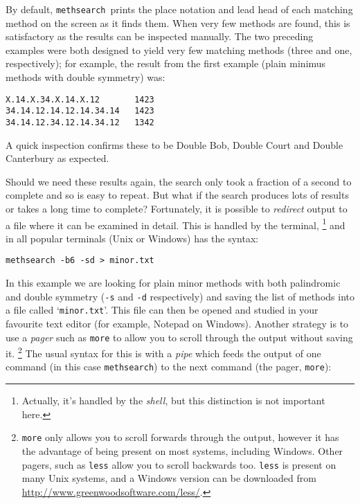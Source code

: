 \documentclass[a4paper,11pt,oneside]{book}
\makeatletter
\def\textitidx#1{\textit{#1}\index{#1}}
\newcommand{\oi}[1]{\index{#1@{\hspace*{-\optwidth}\texttt{-}\texttt{#1}}}}
\newcommand{\symidx}[2]{} %
\newcommand{\ttcmdidx}[1]{\texttt{#1}\index{#1@{\texttt{#1}}}}
\def\methsearch{\texttt{meth\-search}}
\makeatother
\begin{document}
By default, \methsearch\ prints the place notation and lead head 
of each matching method on the screen as it finds them.   When very few
methods are found, this is satisfactory as the results can be 
inspected manually.  The two preceding examples were both designed to
yield very few matching methods (three and one, respectively);
for example, the result from the first example (plain minimus methods 
with double symmetry) was:

\begin{Verbatim}
X.14.X.34.X.14.X.12       1423
34.14.12.14.12.14.34.14   1423
34.14.12.34.12.14.34.12   1342
\end{Verbatim}

A quick inspection confirms these to be Double Bob, Double Court and
Double Canterbury as expected.  

Should we need these results again, the search only took a fraction of a 
second to complete and so is easy to repeat.  But what if the search produces
lots of results or takes a long time to complete?  Fortunately, it is 
possible to \textit{redirect} output to a file where it can be examined 
in detail.\symidx{>}{shell, redirection}  This is handled by the terminal,%
\footnote{Actually, it's handled by the \textitidx{shell}, but this distinction
is not important here.}
and in all popular terminals (Unix or Windows) has the syntax:

\begin{Verbatim}
methsearch -b6 -sd > minor.txt
\end{Verbatim}

In this example we are looking for plain minor methods with both palindromic
and double symmetry (\verb+-s+ and \verb+-d+ respectively)\oi{s}\oi{d}%
and saving the list of methods into a file called
`\verb+minor.txt+'.  This file can then be opened and studied in your 
favourite text editor (for example, Notepad on Windows).%
Another strategy
is to use a \textitidx{pager} such as \ttcmdidx{more}
to allow you to scroll through the output
without saving it.%
\footnote{\verb+more+ only allows you to scroll forwards through the output,
however it has the advantage of being present on most systems, including
Windows.  Other pagers, such as \ttcmdidx{less}
allow you to scroll backwards too.
\verb+less+ is present on many Unix systems, and a Windows version can be
downloaded from \url{http://www.greenwoodsoftware.com/less/}.}  
The usual syntax for this is with a \textitidx{pipe}\symidx{"|}{pipe} 
which feeds the output of one command (in this case \methsearch) 
to the next command (the pager, \verb+more+):
\end{document}
